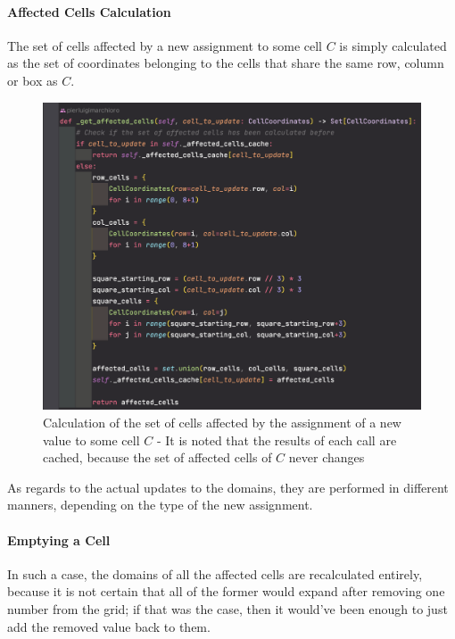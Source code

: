 \paragraph{Affected Cells Calculation} The set of cells affected by a new assignment to some cell $C$ is simply calculated as the set of coordinates belonging to the cells that share the same row, column or box as $C$.

\begin{figure}[h]
    \centering
    \includegraphics[scale=0.65]{assignment-1/images/cp/domains-3-calc-affected-doms.png}
    \caption{Calculation of the set of cells affected by the assignment of a new value to some cell $C$ - It is noted that the results of each call are cached, because the set of affected cells of $C$ never changes}
    \label{fig:domain_3}
\end{figure}

\par
As regards to the actual updates to the domains, they are performed in different manners, depending on the type of the new assignment.

\paragraph{Emptying a Cell} In such a case, the domains of all the affected cells are recalculated entirely, because it is not certain that all of the former would expand after removing one number from the grid; if that was the case, then it would've been enough to just add the removed value back to them.

